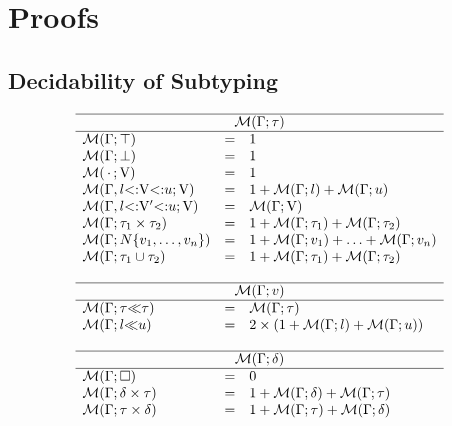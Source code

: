 \section{Proofs}

\subsection{Decidability of Subtyping}\label{subsec:dec-proof}

\begin{figure}
\footnotesize
\[
\begin{array}{lcl}
    \hline
    \multicolumn{3}{c}{\tymsrdflt{\ty}} \\ 
    \hline 
    \tymsrdflt{\tyany} &=& 1\\
    \tymsrdflt{\tybot} &=& 1\\
    \tymsr{\,\EmptyEnv\,}{\vany} &=& 1\\
    \tymsr{\AEnv, \varbound{\vany}{\tylb}{\tyub}}{\vany} &=& 
        1 + \tymsrdflt{\tylb} + \tymsrdflt{\tyub}\\
    \tymsr{\AEnv, \varbound{\vany'}{\tylb}{\tyub}}{\vany} &=& 
        \tymsrdflt{\vany} \\
    \tymsrdflt{\typair{\ty_1}{\ty_2}} &=& 
        1 + \tymsrdflt{\ty_1} + \tymsrdflt{\ty_2}\\
    \tymsrdflt{\tyinv\iname{\rexvar_1,\ldots,\rexvar_n}} &=&
        1 + \tymsrdflt{\rexvar_1} + \ldots + \tymsrdflt{\rexvar_n}\\
    \tymsrdflt{\tyunion{\ty_1}{\ty_2}} &=& 
        1 + \tymsrdflt{\ty_1} + \tymsrdflt{\ty_2}\\
    \\
    \hline
    \multicolumn{3}{c}{\tymsrdflt{\rexvar}} \\ 
    \hline 
    \tymsrdflt{\rexvarbound{\ty}{\ty}} &=& \tymsrdflt{\ty}\\
    \tymsrdflt{\rexvarbound{\tylb}{\tyub}} &=& 
        2\times(1 + \tymsrdflt{\tylb} + \tymsrdflt{\tyub})\\
    \\
    \hline
    \multicolumn{3}{c}{\tymsrdflt{\dctx}} \\ 
    \hline 
    \tymsrdflt{\square} &=& 0\\
    \tymsrdflt{\typair{\dctx}{\ty}} &=& 
        1 + \tymsrdflt{\dctx} + \tymsrdflt{\ty}\\
    \tymsrdflt{\typair{\ty}{\dctx}} &=& 
        1 + \tymsrdflt{\ty} + \tymsrdflt{\dctx}\\

\end{array}\]
\end{figure}

